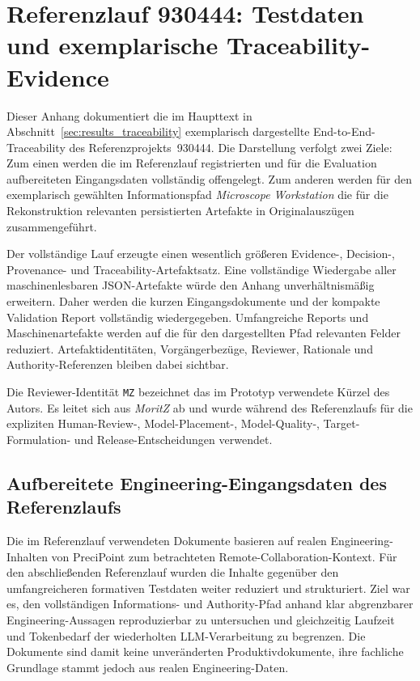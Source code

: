 
\section{Referenzlauf 930444: Testdaten und exemplarische Traceability-Evidence}
\label{app:traceability_930444}

Dieser Anhang dokumentiert die im Haupttext in
Abschnitt~\ref{sec:results_traceability} exemplarisch dargestellte
End-to-End-Traceability des Referenzprojekts~930444. Die Darstellung verfolgt
zwei Ziele: Zum einen werden die im Referenzlauf registrierten und für die
Evaluation aufbereiteten Eingangsdaten vollständig offengelegt. Zum anderen
werden für den exemplarisch gewählten Informationspfad
\emph{Microscope Workstation} die für die Rekonstruktion relevanten
persistierten Artefakte in Originalauszügen zusammengeführt.

Der vollständige Lauf erzeugte einen wesentlich größeren Evidence-, Decision-,
Provenance- und Traceability-Artefaktsatz. Eine vollständige Wiedergabe aller
maschinenlesbaren JSON-Artefakte würde den Anhang unverhältnismäßig erweitern.
Daher werden die kurzen Eingangsdokumente und der kompakte Validation Report
vollständig wiedergegeben. Umfangreiche Reports und Maschinenartefakte werden auf die für
den dargestellten Pfad relevanten Felder reduziert. Artefaktidentitäten,
Vorgängerbezüge, Reviewer, Rationale und Authority-Referenzen bleiben dabei
sichtbar.

Die Reviewer-Identität \texttt{MZ} bezeichnet das im Prototyp verwendete
Kürzel des Autors. Es leitet sich aus \emph{MoritZ} ab und wurde während des
Referenzlaufs für die expliziten Human-Review-, Model-Placement-,
Model-Quality-, Target-Formulation- und Release-Entscheidungen verwendet.

\subsection{Aufbereitete Engineering-Eingangsdaten des Referenzlaufs}
\label{app:traceability_930444_inputs}

Die im Referenzlauf verwendeten Dokumente basieren auf realen
Engineering-Inhalten von PreciPoint zum betrachteten
Remote-Collaboration-Kontext. Für den abschließenden Referenzlauf wurden die
Inhalte gegenüber den umfangreicheren formativen Testdaten weiter reduziert
und strukturiert. Ziel war es, den vollständigen Informations- und
Authority-Pfad anhand klar abgrenzbarer Engineering-Aussagen reproduzierbar
zu untersuchen und gleichzeitig Laufzeit und Tokenbedarf der wiederholten
LLM-Verarbeitung zu begrenzen. Die Dokumente sind damit keine unveränderten
Produktivdokumente, ihre fachliche Grundlage stammt jedoch aus realen
Engineering-Daten.

